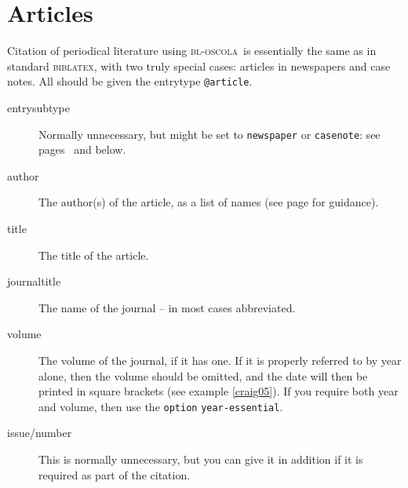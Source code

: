 \documentclass[a4paper,
               11pt,
	       DIV=1,			   
	       footinclude=false]
	      {scrartcl}
\newcommand{\oscola}{\textsc{bl-oscola}}
\newcommand{\biblatex}{\textsc{biblatex}}
\begin{document}
\section{Articles}

Citation of periodical literature using \oscola\ is essentially the
same as in standard \biblatex, with two truly special cases: articles
in newspapers and case notes. All should be given the entrytype
\texttt{@article}.

\begin{description}
\item[entrysubtype] 
Normally unnecessary, but might be set to \verb|newspaper| or \verb|casenote|: see pages~\pageref{newspaper:article} and \pageref{casenotes} below.
\item[author] The author(s) of the article, as a list of names (see page \pageref{namelists} for guidance).
\item[title] The title of the article.
\item[journaltitle] The name of the journal -- in most cases abbreviated.
\item[volume] 
The volume of the journal, if it has one. If it is properly referred to by year alone, then the volume should be omitted, and the date will then be printed in square brackets (see example \ref{craig05}). If you require both year and volume, then use the \verb|option| \texttt{year-essential}.
\item[issue\slash number] 
This is normally unnecessary, but you can give it in addition if it is required as part of the citation.

\end{description}
\end{document}
